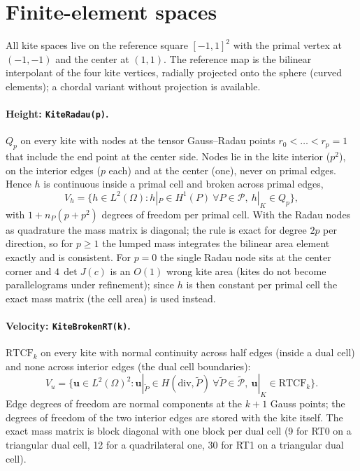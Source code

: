 \documentclass[11pt,a4paper]{article}
\newcommand{\bu}{\mathbf{u}}
\newcommand{\Pc}{\mathcal{P}}
\newcommand{\Pt}{\widetilde{\mathcal{P}}}
\newcommand{\code}[1]{\texttt{#1}}
\begin{document}
\section{Finite-element spaces}

All kite spaces live on the reference square $[-1,1]^2$ with the primal vertex
at $(-1,-1)$ and the center at $(1,1)$. The reference map is the bilinear
interpolant of the four kite vertices, radially projected onto the sphere
(curved elements); a chordal variant without projection is available.

\paragraph{Height: \code{KiteRadau(p)}.} $Q_p$ on every kite with nodes at the
tensor Gauss--Radau points $r_0<\dots<r_p = 1$ that include the end point at the
center side. Nodes lie in the kite interior ($p^2$), on the interior edges
($p$ each) and at the center (one), never on primal edges. Hence $h$ is
continuous inside a primal cell and broken across primal edges,
\[
  V_h = \{ h \in L^2(\Omega) : h|_P \in H^1(P)\ \forall P\in\Pc,\ h|_K\in Q_p \},
\]
with $1 + n_P(p + p^2)$ degrees of freedom per primal cell. With the Radau nodes
as quadrature the mass matrix is diagonal; the rule is exact for degree $2p$
per direction, so for $p\ge1$ the lumped mass integrates the bilinear
area element exactly and is consistent. For $p = 0$ the single Radau node sits
at the center corner and $4\,\det J(c)$ is an $O(1)$ wrong kite area (kites do
not become parallelograms under refinement); since $h$ is then constant per
primal cell the exact mass matrix (the cell area) is used instead.

\paragraph{Velocity: \code{KiteBrokenRT(k)}.} $\mathrm{RTCF}_k$ on every kite
with normal continuity across half edges (inside a dual cell) and none across
interior edges (the dual cell boundaries):
\[
  V_u = \{ \bu \in L^2(\Omega)^2 : \bu|_{\widetilde P} \in H(\mathrm{div},\widetilde P)
  \ \forall \widetilde P\in\Pt,\ \bu|_K\in\mathrm{RTCF}_k \}.
\]
Edge degrees of freedom are normal components at the $k+1$ Gauss points; the
degrees of freedom of the two interior edges are stored with the kite itself.
The exact mass matrix is block diagonal with one block per dual cell (9 for
RT0 on a triangular dual cell, 12 for a quadrilateral one, 30 for RT1 on a
triangular dual cell).
\end{document}
